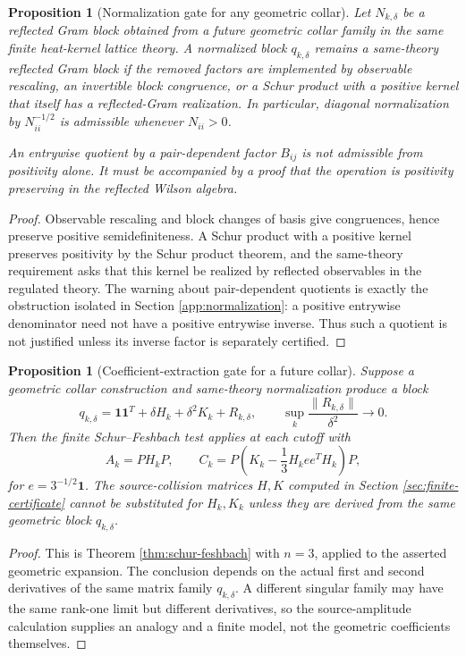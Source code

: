 \documentclass[11pt]{article}
\newtheorem{proposition}[theorem]{Proposition}
\newcommand{\one}{\mathbf 1}
\newcommand{\norm}[1]{\lVert #1\rVert}
\begin{document}
\begin{proposition}[Normalization gate for any geometric collar]
\label{prop:collar-normalization-gate}
Let \(N_{k,\delta}\) be a reflected Gram block obtained from a future geometric collar family in the same finite heat-kernel lattice theory.  A normalized block \(q_{k,\delta}\) remains a same-theory reflected Gram block if the removed factors are implemented by observable rescaling, an invertible block congruence, or a Schur product with a positive kernel that itself has a reflected-Gram realization.  In particular, diagonal normalization by \(N_{ii}^{-1/2}\) is admissible whenever \(N_{ii}>0\).

An entrywise quotient by a pair-dependent factor \(B_{ij}\) is not admissible from positivity alone.  It must be accompanied by a proof that the operation is positivity preserving in the reflected Wilson algebra.
\end{proposition}

\begin{proof}
Observable rescaling and block changes of basis give congruences, hence preserve positive semidefiniteness.  A Schur product with a positive kernel preserves positivity by the Schur product theorem, and the same-theory requirement asks that this kernel be realized by reflected observables in the regulated theory.  The warning about pair-dependent quotients is exactly the obstruction isolated in Section \ref{app:normalization}: a positive entrywise denominator need not have a positive entrywise inverse.  Thus such a quotient is not justified unless its inverse factor is separately certified.
\end{proof}

\begin{proposition}[Coefficient-extraction gate for a future collar]
\label{prop:collar-coefficient-gate}
Suppose a geometric collar construction and same-theory normalization produce a block
\[
  q_{k,\delta}
  =
  \one\one^T+\delta H_k+\delta^2K_k+R_{k,\delta},
  \qquad
  \sup_k\frac{\norm{R_{k,\delta}}}{\delta^2}\to0.
\]
Then the finite Schur--Feshbach test applies at each cutoff with
\[
  A_k=PH_kP,
  \qquad
  C_k=P\left(K_k-\frac13H_kee^TH_k\right)P,
\]
for \(e=3^{-1/2}\one\).  The source-collision matrices \(H,K\) computed in Section \ref{sec:finite-certificate} cannot be substituted for \(H_k,K_k\) unless they are derived from the same geometric block \(q_{k,\delta}\).
\end{proposition}

\begin{proof}
This is Theorem \ref{thm:schur-feshbach} with \(n=3\), applied to the asserted geometric expansion.  The conclusion depends on the actual first and second derivatives of the same matrix family \(q_{k,\delta}\).  A different singular family may have the same rank-one limit but different derivatives, so the source-amplitude calculation supplies an analogy and a finite model, not the geometric coefficients themselves.
\end{proof}
\end{document}

